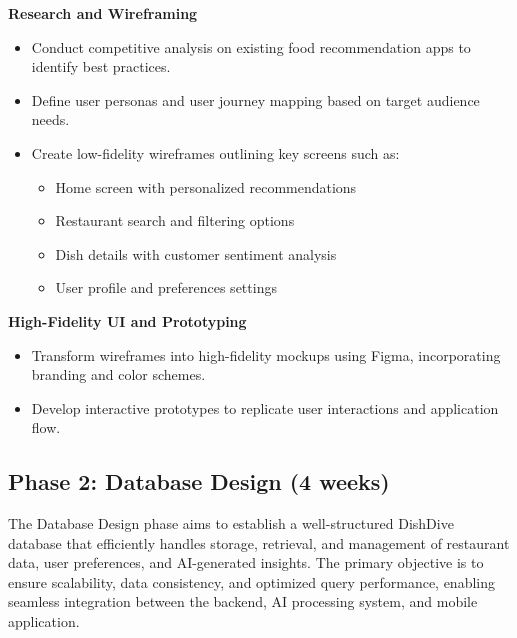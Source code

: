 \textbf{Research and Wireframing}
\begin{itemize}
\item Conduct competitive analysis on existing food recommendation apps to identify best practices.
\item Define user personas and user journey mapping based on target audience needs.
\item Create low-fidelity wireframes outlining key screens such as:
	\begin{itemize}
	\item Home screen with personalized recommendations
	\item Restaurant search and filtering options
	\item Dish details with customer sentiment analysis
	\item User profile and preferences settings
	\end{itemize}
\end{itemize}

\textbf{High-Fidelity UI and Prototyping}
\begin{itemize}
\item Transform wireframes into high-fidelity mockups using Figma, incorporating branding and color schemes.
\item Develop interactive prototypes to replicate user interactions and application flow.
\end{itemize}

\subsection*{Phase 2: Database Design (4 weeks)}
The Database Design phase aims to establish a well-structured DishDive database that efficiently handles storage, retrieval, and management of restaurant data, user preferences, and AI-generated insights. The primary objective is to ensure scalability, data consistency, and optimized query performance, enabling seamless integration between the backend, AI processing system, and mobile application.

